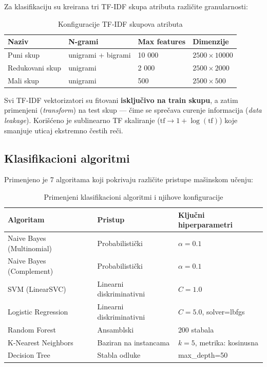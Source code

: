 \documentclass[12pt, a4paper]{article}
\begin{document}
Za klasifikaciju su kreirana tri TF-IDF skupa atributa različite granularnosti:

\begin{table}[H]
\centering
\caption{Konfiguracije TF-IDF skupova atributa}
\begin{tabular}{llll}
\toprule
\textbf{Naziv}        & \textbf{N-grami}     & \textbf{Max features} & \textbf{Dimenzije} \\
\midrule
Puni skup             & unigrami + bigrami   & 10 000 & $2500 \times 10000$ \\
Redukovani skup       & unigrami             & 2 000  & $2500 \times 2000$  \\
Mali skup             & unigrami             & 500    & $2500 \times 500$   \\
\bottomrule
\end{tabular}
\end{table}

Svi TF-IDF vektorizatori su fitovani \textbf{isključivo na train skupu}, a zatim
primenjeni (\textit{transform}) na test skup — čime se sprečava curenje informacija
(\textit{data leakage}). Korišćeno je sublinearno TF skaliranje ($\text{tf} \to 1 + \log(\text{tf})$)
koje smanjuje uticaj ekstremno čestih reči.

\subsection{Klasifikacioni algoritmi}

Primenjeno je 7 algoritama koji pokrivaju različite pristupe mašinskom učenju:

\begin{table}[H]
\centering
\caption{Primenjeni klasifikacioni algoritmi i njihove konfiguracije}
\begin{tabular}{lll}
\toprule
\textbf{Algoritam}            & \textbf{Pristup}        & \textbf{Ključni hiperparametri} \\
\midrule
Naive Bayes (Multinomial)     & Probabilistički         & $\alpha = 0.1$ \\
Naive Bayes (Complement)      & Probabilistički         & $\alpha = 0.1$ \\
SVM (LinearSVC)               & Linearni diskriminativni & $C = 1.0$ \\
Logistic Regression           & Linearni diskriminativni & $C = 5.0$, solver=lbfgs \\
Random Forest                 & Ansamblski              & 200 stabala \\
K-Nearest Neighbors           & Baziran na instancama   & $k=5$, metrika: kosinusna \\
Decision Tree                 & Stabla odluke           & max\_depth=50 \\
\bottomrule
\end{tabular}
\end{table}
\end{document}
